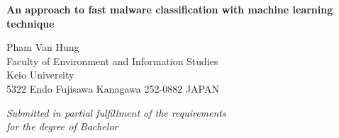 

\thispagestyle{empty}

\begin{center}

\vspace{30mm}
{\LARGE\bf An approach to fast malware classification with machine learning technique }\\ 

\vspace{10mm}

{\LARGE Pham Van Hung}\\
\vspace{10mm}
{\Large Faculty of Environment and Information Studies}\\
\vspace{5mm}
{\LARGE Keio University}\\
\vspace{5mm}
{\Large 5322 Endo Fujisawa Kanagawa 252-0882}
{\Large JAPAN}\\
\vspace{10mm}

{\Large\it  Submitted in partial fulfillment of the requirements} \\
\vspace{3mm}
{\Large\it  for the degree of Bachelor}\\

\vspace{12mm}


\end{center}
